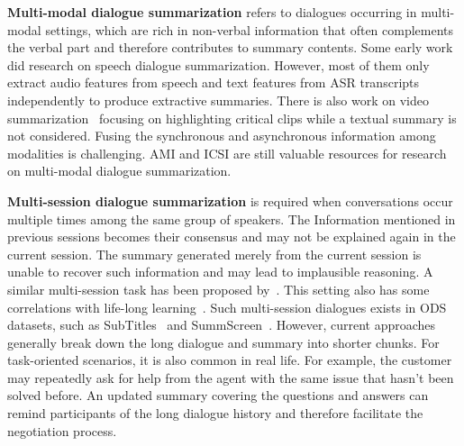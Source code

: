 \textbf{Multi-modal dialogue summarization} refers to dialogues occurring in 
multi-modal settings, which are rich in non-verbal information 
that often complements the verbal part and therefore contributes to 
summary contents. Some early work did research on speech dialogue summarization. 
However, most of them only extract audio features from speech and text 
features from ASR transcripts independently to produce extractive summaries. 
There is also work on video summarization~\cite{hussain2021video} focusing 
on highlighting critical clips while a textual summary is not considered.
Fusing the synchronous and asynchronous information among modalities 
is challenging. AMI and ICSI are still valuable resources for 
research on multi-modal dialogue summarization.



\textbf{Multi-session dialogue summarization} is required when conversations 
occur multiple times among the same group of speakers. 
The Information mentioned in previous sessions becomes their consensus and 
may not be explained again in the current session. 
The summary generated merely from the current session is unable to 
recover such information and may lead to implausible reasoning. 
A similar multi-session task has been proposed by~\citet{xu2021beyond}. 
This setting also has some correlations with life-long learning~\cite{liu2021lifelong}.
Such multi-session dialogues exists in ODS datasets, such as SubTitles~\cite{malykh2020sumtitles} and SummScreen~\cite{chen2021summscreen}. However, current approaches generally break down the long dialogue and summary into shorter chunks. 
For task-oriented scenarios, it is also common in real life. For example, the customer may repeatedly ask for help from the agent with the same issue that hasn't been solved before. An updated summary covering the questions and answers can remind participants of the long dialogue history and therefore facilitate the negotiation process. 



